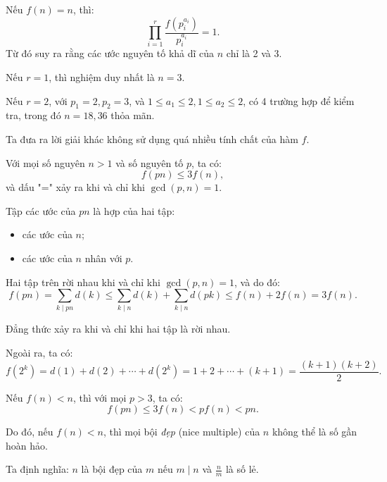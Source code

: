 \begin{problem}
\begin{soln}
    Nếu \( f(n) = n \), thì:
    \[
        \prod_{i = 1}^r \frac{f(p_i^{a_i})}{p_i^{a_i}} = 1.
    \]
    Từ đó suy ra rằng các ước nguyên tố khả dĩ của \( n \) chỉ là 2 và 3.

    Nếu \( r = 1 \), thì nghiệm duy nhất là \( n = 3 \).

    Nếu \( r = 2 \), với \( p_1 = 2, p_2 = 3 \), và \( 1 \le a_1 \le 2, 1 \le a_2 \le 2 \), có 4 trường hợp để kiểm tra, trong đó \( n = 18, 36 \) thỏa mãn.
\end{soln}

\begin{soln}
    Ta đưa ra lời giải khác không sử dụng quá nhiều tính chất của hàm \( f \).

    \begin{lemma*}
        Với mọi số nguyên \( n > 1 \) và số nguyên tố \( p \), ta có:
        \[
            f(pn) \le 3f(n),
        \]
        và dấu "=" xảy ra khi và chỉ khi \( \gcd(p, n) = 1 \).
    \end{lemma*}
    \begin{subproof}
        Tập các ước của \( pn \) là hợp của hai tập:
        \begin{itemize}
            \item các ước của \( n \);
            \item các ước của \( n \) nhân với \( p \).
        \end{itemize}

        Hai tập trên rời nhau khi và chỉ khi \( \gcd(p, n) = 1 \), và do đó:
        \[
            f(pn) = \sum_{k \mid pn} d(k) \le \sum_{k \mid n} d(k) + \sum_{k \mid n} d(pk) \le f(n) + 2f(n) = 3f(n).
        \]

        Đẳng thức xảy ra khi và chỉ khi hai tập là rời nhau.
    \end{subproof}

    Ngoài ra, ta có:
    \[
        f(2^k) = d(1) + d(2) + \cdots + d(2^k) = 1 + 2 + \cdots + (k+1) = \frac{(k+1)(k+2)}{2}.
    \]

    Nếu \( f(n) < n \), thì với mọi \( p > 3 \), ta có:
    \[
        f(pn) \le 3f(n) < pf(n) < pn.
    \]

    Do đó, nếu \( f(n) < n \), thì mọi bội \textit{đẹp} (nice multiple) của \( n \) không thể là số gần hoàn hảo.

    Ta định nghĩa: \( n \) là bội đẹp của \( m \) nếu \( m \mid n \) và \( \frac{n}{m} \) là số lẻ.


\end{soln}
\end{problem}
